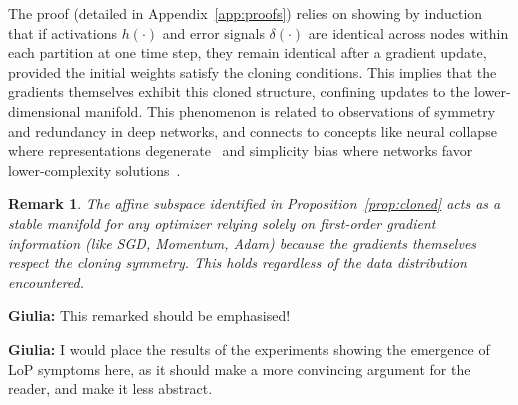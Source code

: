 \documentclass{article}
\newcommand{\giulia}[1]{{\color{ForestGreen}\textbf{Giulia:} #1}}
\newtheorem{remark}{Remark}[section]
\begin{document}

The proof (detailed in Appendix~\ref{app:proofs}) relies on showing by induction that if activations $h(\cdot)$ and error signals $\delta(\cdot)$ are identical across nodes within each partition at one time step, they remain identical after a gradient update, provided the initial weights satisfy the cloning conditions. This implies that the gradients themselves exhibit this cloned structure, confining updates to the lower-dimensional manifold. This phenomenon is related to observations of symmetry and redundancy in deep networks, and connects to concepts like neural collapse where representations degenerate~\citep{papyan2020prevalence} and simplicity bias where networks favor lower-complexity solutions~\citep{huh2022lowrank}.


\begin{remark}
The affine subspace identified in Proposition~\ref{prop:cloned} acts as a stable manifold for any optimizer relying solely on first-order gradient information (like SGD, Momentum, Adam) because the gradients themselves respect the cloning symmetry. This holds regardless of the data distribution encountered.
\end{remark}
\giulia{This remarked should be emphasised!}

\giulia{I would place the results of the experiments showing the emergence of LoP symptoms here, as it should make a more convincing argument for the reader, and make it less abstract.}
\end{document}
